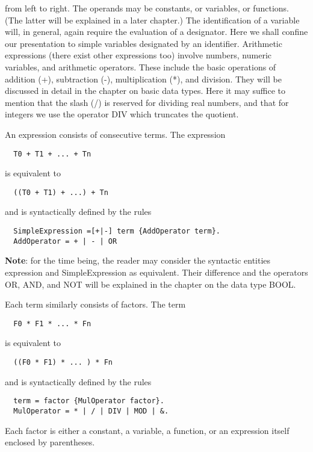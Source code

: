 from left to right. The operands may be constants, or variables, or functions. (The latter will be
explained in a later chapter.) The identification of a variable will, in general, again require the
evaluation of a designator. Here we shall confine our presentation to simple variables designated
by an identifier. Arithmetic expressions (there exist other expressions too) involve numbers,
numeric variables, and arithmetic operators. These include the basic operations of addition (+),
subtraction (-), multiplication (*), and division. They will be discussed in detail in the chapter on
basic data types. Here it may suffice to mention that the slash (/) is reserved for dividing real
numbers, and that for integers we use the operator DIV which truncates the quotient.

An expression consists of consecutive terms. The expression
\begin{verbatim}
  T0 + T1 + ... + Tn
\end{verbatim}
is equivalent to
\begin{verbatim}
  ((T0 + T1) + ...) + Tn
\end{verbatim}
and is syntactically defined by the rules
\begin{verbatim}
  SimpleExpression =[+|-] term {AddOperator term}.
  AddOperator = + | - | OR
\end{verbatim}

\textbf{Note}: for the time being, the reader may consider the syntactic entities expression and
SimpleExpression as equivalent. Their difference and the operators OR, AND, and NOT will be
explained in the chapter on the data type BOOL.

Each term similarly consists of factors. The term
\begin{verbatim}
  F0 * F1 * ... * Fn
\end{verbatim}
is equivalent to
\begin{verbatim}
  ((F0 * F1) * ... ) * Fn
\end{verbatim}
and is syntactically defined by the rules
\begin{verbatim}
  term = factor {MulOperator factor}.
  MulOperator = * | / | DIV | MOD | &.
\end{verbatim}
Each factor is either a constant, a variable, a function, or an expression itself enclosed by
parentheses.

